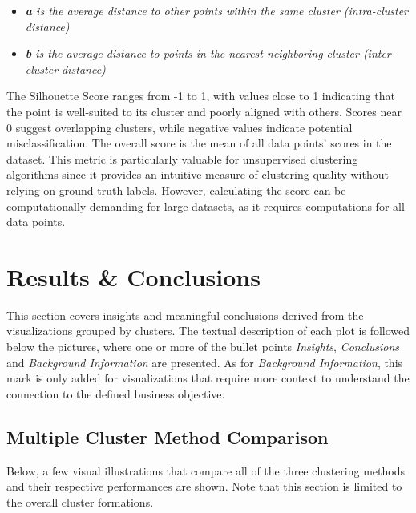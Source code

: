 \documentclass[11pt]{article}
\begin{document}
\begin{itemize}
	\item \textit{\textbf{a} is the average distance to other points within the same cluster (intra-cluster distance)}

	\item \textit{\textbf{b} is the average distance to points in the nearest neighboring cluster (inter-cluster distance)}

\end{itemize}
\vspace{1\baselineskip}
The Silhouette Score ranges from -1 to 1, with values close to 1 indicating that the point is well-suited to its cluster and poorly aligned with others. Scores near 0 suggest overlapping clusters, while negative values indicate potential misclassification. The overall score is the mean of all data points' scores in the dataset. This metric is particularly valuable for unsupervised clustering algorithms since it provides an intuitive measure of clustering quality without relying on ground truth labels. However, calculating the score can be computationally demanding for large datasets, as it requires computations for all data points.

\vspace{1\baselineskip}
\section{Results \& Conclusions}

This section covers insights and meaningful conclusions derived from the visualizations grouped by clusters. The textual description of each plot is followed below the pictures, where one or more of the bullet points \textit{Insights}, \textit{Conclusions} and \textit{Background Information} are presented. As for \textit{Background Information}, this mark is only added for visualizations that require more context to understand the connection to the defined business objective.

\vspace{1\baselineskip}
\subsection{Multiple Cluster Method Comparison}

Below, a few visual illustrations that compare all of the three clustering methods and their respective performances are shown. Note that this section is limited to the overall cluster formations.
\end{document}
